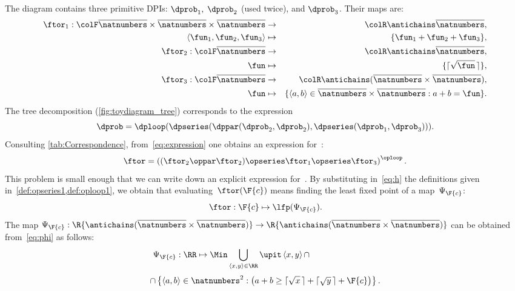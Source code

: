 The diagram contains three primitive DPIs: $\dprob_{1},$
$\dprob_{2}$ (used twice), and $\dprob_{3}$. Their \ftor maps
are:
\begin{eqnarray*}
  \ftor_{1}:{\colF\overline{\natnumbers}\times\overline{\natnumbers}\times\overline{\natnumbers}} & \rightarrow & {\colR\antichains\overline{\natnumbers}},\\
  \left\langle \fun_{1},\fun_{2},\fun_{3}\right\rangle  & \mapsto & \{\fun_{1}+\fun_{2}+\fun_{3}\},\\
  \ftor_{2}:{\colF\overline{\natnumbers}} & \rightarrow & {\colR\antichains\overline{\natnumbers}},\\
  \fun& \mapsto & \{\lceil\sqrt{\fun}\,\rceil\},\\
  \ftor_{3}:{\colF\overline{\natnumbers}} & \rightarrow & {\colR\antichains(\overline{\natnumbers}\times\overline{\natnumbers})},\\
  \fun& \mapsto & \{\left\langle a,b\right\rangle \in\overline{\natnumbers}\times\overline{\natnumbers}:a+b=\fun\}.
\end{eqnarray*}
The tree decomposition (\cref{fig:toydiagram_tree}) corresponds to
the expression
\begin{equation}
  \dprob=\dploop(\dpseries(\dppar(\dprob_{2},\dprob_{2}),\dpseries(\dprob_{1},\dprob_{3}))).\label{eq:expression}
\end{equation}
Consulting \cref{tab:Correspondence}, from~\cref{eq:expression}
one obtains an expression for~\ftor:
\begin{equation}
  \ftor=\left((\ftor_{2}\oppar\ftor_{2})\opseries\ftor_{1}\opseries\ftor_{3}\right)^{\oploop}.\label{eq:h}
\end{equation}
This problem is small enough that we can write down an explicit expression
for~\ftor. By substituting in~\cref{eq:h} the definitions given in~\cref{def:opseries1,def:oploop1}, we obtain that
evaluating~$\ftor(\F{c})$ means finding the least fixed point of a map~$\Psi_{\F{c}}$:
\[
  \ftor:\F{c}\mapsto\lfp(\Psi_{\F{c}}).
\]
The map $\Psi_{\F{c}}:\R{\antichains(\overline{\natnumbers}\times\overline{\natnumbers})}\rightarrow\R{\antichains(\overline{\natnumbers}\times\overline{\natnumbers})}$
can be obtained from~\cref{eq:phi} as follows:
\begin{equation}
  \Psi_{\F{c}}:\RR\mapsto\Min\bigcup_{\left\langle x,y\right\rangle \in\RR}\upit\left\langle x,y\right\rangle \cap\qquad\qquad\qquad\qquad
\end{equation}
\begin{equation}
  \cap\left\{ \left\langle a,b\right\rangle \in\natnumbers^{2}:\left(a+b\geq\lceil\sqrt{x}\,\rceil+\lceil\sqrt{y}\,\rceil+\F{c}\right)\right\}.
\end{equation}

